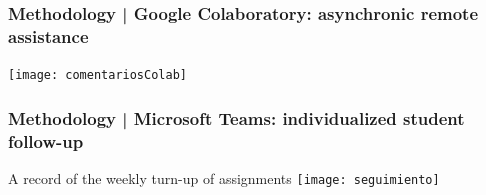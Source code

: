 \documentclass[aspectratio=169]{beamer}
\begin{document}
\begin{frame}
	\frametitle{Methodology | Google Colaboratory: asynchronic remote assistance}
	\begin{block}{}
		\texttt{[image: comentariosColab]}
	\end{block}
\end{frame}



\begin{frame}
	\frametitle{Methodology | Microsoft Teams: individualized student follow-up}
	\begin{block}{A record of the weekly turn-up of assignments}
		\texttt{[image: seguimiento]}
	\end{block}
\end{frame}


\end{document}
